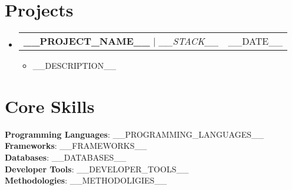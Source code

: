 \documentclass[letterpaper,11pt]{article}
\makeatletter
\newcommand{\resumeItem}[1]{
  \item\small{
    {#1 \vspace{-2pt}}
  }
}
\newcommand{\resumeProjectHeading}[2]{
    \item
    \begin{tabular*}{0.97\textwidth}{l@{\extracolsep{\fill}}r}
      \small#1 & #2 \\
    \end{tabular*}\vspace{-7pt}
}
\newcommand{\resumeSubHeadingListStart}{\begin{itemize}[leftmargin=0.15in, label={}]}
\newcommand{\resumeSubHeadingListEnd}{\end{itemize}}
\newcommand{\resumeItemListStart}{\begin{itemize}}
\newcommand{\resumeItemListEnd}{\end{itemize}\vspace{-5pt}}
\makeatother
\begin{document}
\section{Projects}
    \resumeSubHeadingListStart
      \resumeProjectHeading
          {\textbf{__PROJECT_NAME__} $|$ \emph{__STACK__}}{__DATE__}
          \resumeItemListStart
            \resumeItem{__DESCRIPTION__}
          \resumeItemListEnd

    \resumeSubHeadingListEnd



%
\section{Core Skills}
 \begin{itemize}[leftmargin=0.15in, label={}]
    \small{\item{
     \textbf{Programming Languages}{: __PROGRAMMING_LANGUAGES__} \\
     \textbf{Frameworks}{: __FRAMEWORKS__} \\
     \textbf{Databases}{: __DATABASES__} \\
     \textbf{Developer Tools}{: __DEVELOPER_TOOLS__} \\
     \textbf{Methodologies}{: __METHODOLIGIES__}
    }}
 \end{itemize}


\end{document}
